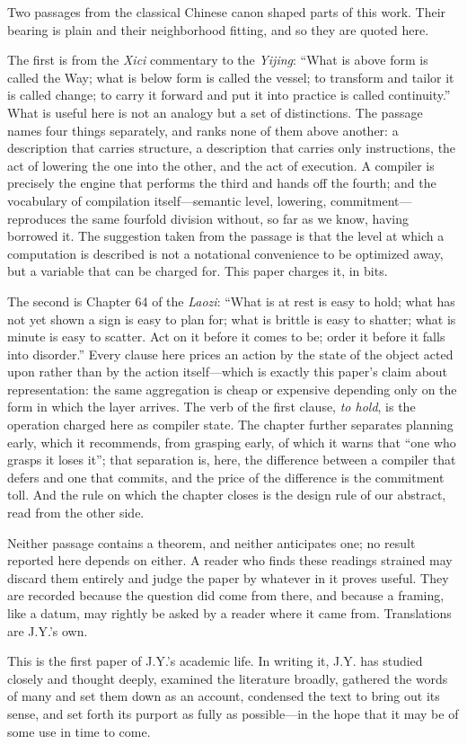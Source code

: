 \documentclass[aps,prx,reprint,floatfix,superscriptaddress]{revtex4-2}
\begin{document}
\begin{acknowledgments}
Two passages from the classical Chinese canon shaped parts of this work.
Their bearing is plain and their neighborhood fitting, and so they are
quoted here.

The first is from the \emph{Xici} commentary to the \emph{Yijing}: ``What
is above form is called the Way; what is below form is called the vessel;
to transform and tailor it is called change; to carry it forward and put it
into practice is called continuity.''  What is useful here is not an
analogy but a set of distinctions.  The passage names four things
separately, and ranks none of them above another: a description that
carries structure, a description that carries only instructions, the act of
lowering the one into the other, and the act of execution.  A compiler is
precisely the engine that performs the third and hands off the fourth; and
the vocabulary of compilation itself---semantic level, lowering,
commitment---reproduces the same fourfold division without, so far as we
know, having borrowed it.  The suggestion taken from the passage is that
the level at which a computation is described is not a notational
convenience to be optimized away, but a variable that can be charged for.
This paper charges it, in bits.

The second is Chapter 64 of the \emph{Laozi}: ``What is at rest is easy to
hold; what has not yet shown a sign is easy to plan for; what is brittle is
easy to shatter; what is minute is easy to scatter.  Act on it before it
comes to be; order it before it falls into disorder.''  Every clause here
prices an action by the state of the object acted upon rather than by the
action itself---which is exactly this paper's claim about representation:
the same aggregation is cheap or expensive depending only on the form in
which the layer arrives.  The verb of the first clause, \emph{to hold}, is
the operation charged here as compiler state.  The chapter further
separates planning early, which it recommends, from grasping early, of
which it warns that ``one who grasps it loses it''; that separation is,
here, the difference between a compiler that defers and one that commits,
and the price of the difference is the commitment toll.  And the rule on
which the chapter closes is the design rule of our abstract, read from the
other side.

Neither passage contains a theorem, and neither anticipates one; no result
reported here depends on either.  A reader who finds these readings
strained may discard them entirely and judge the paper by whatever in it
proves useful.  They are recorded because the question did come from there,
and because a framing, like a datum, may rightly be asked by a reader where
it came from.  Translations are J.Y.'s own.

This is the first paper of J.Y.'s academic life.  In writing it, J.Y. has
studied closely and thought deeply, examined the literature broadly,
gathered the words of many and set them down as an account, condensed the
text to bring out its sense, and set forth its purport as fully as
possible---in the hope that it may be of some use in time to come.
\end{acknowledgments}


\appendix
{}





\end{document}
